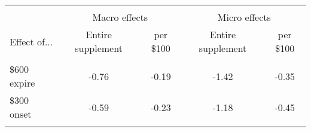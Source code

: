 \begin{tabular}{lcccc}
\\[-1.8ex]\toprule 
 \toprule \\[-1.8ex]
 & \multicolumn{2}{c}{Macro effects} & \multicolumn{2}{c}{Micro effects} \\
Effect of... & Entire supplement & per \$100 & Entire supplement & per \$100 \\ 
 \midrule \\[-1.8ex]
\$600 expire & -0.76 & -0.19 & -1.42 & -0.35 \\ 
  \$300 onset & -0.59 & -0.23 & -1.18 & -0.45 \\ 
  \bottomrule \\[-1.8ex]
\end{tabular}
